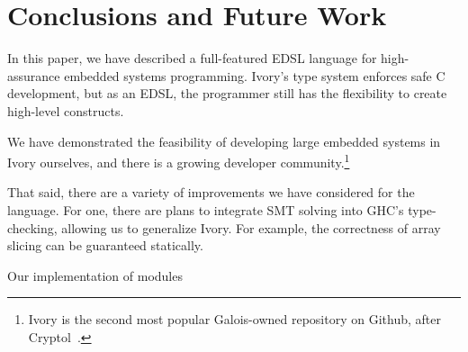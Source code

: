 \section{Conclusions and Future Work}
\label{sec:conlusion}

In this paper, we have described a full-featured EDSL language for
high-assurance embedded systems programming. Ivory's type system enforces safe C
development, but as an EDSL, the programmer still has the flexibility to create
high-level constructs.

We have demonstrated the feasibility of developing large embedded systems in
Ivory ourselves, and there is a growing developer community.\footnote{Ivory is the
second most popular Galois-owned repository on Github, after Cryptol~\cite{}.}

That said, there are a variety of improvements we have considered for the
language. For one, there are plans to integrate SMT solving into GHC's
type-checking, allowing us to generalize Ivory. For example, the correctness of
array slicing can be guaranteed statically.

Our implementation of modules



